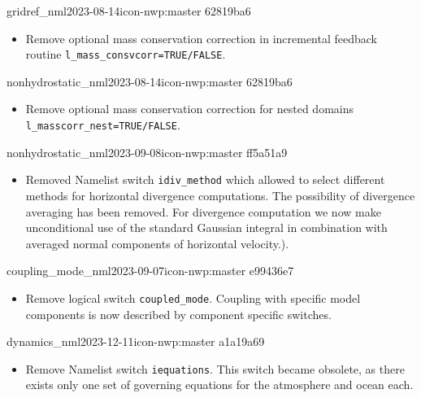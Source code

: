 \begin{changeitem}{gridref\_nml}{2023-08-14}{icon-nwp:master 62819ba6}
  \begin{itemize}
   \item Remove optional mass conservation correction in incremental feedback routine \texttt{l\_mass\_consvcorr=TRUE/FALSE}.
  \end{itemize}
\end{changeitem}

\begin{changeitem}{nonhydrostatic\_nml}{2023-08-14}{icon-nwp:master 62819ba6}
  \begin{itemize}
   \item Remove optional mass conservation correction for nested domains \texttt{l\_masscorr\_nest=TRUE/FALSE}.
  \end{itemize}
\end{changeitem}

\begin{changeitem}{nonhydrostatic\_nml}{2023-09-08}{icon-nwp:master ff5a51a9}
  \begin{itemize}
   \item Removed Namelist switch \texttt{idiv\_method} which allowed to select different methods for horizontal divergence computations. The possibility of divergence averaging has been removed. For divergence computation we now make unconditional use of the standard Gaussian integral in combination with averaged normal components of horizontal velocity.).
  \end{itemize}
\end{changeitem}

\begin{changeitem}{coupling\_mode\_nml}{2023-09-07}{icon-nwp:master e99436e7}
  \begin{itemize}
   \item Remove logical switch \texttt{coupled\_mode}. Coupling with specific
     model components is now described by component specific switches.
  \end{itemize}
\end{changeitem}

\begin{changeitem}{dynamics\_nml}{2023-12-11}{icon-nwp:master a1a19a69}
  \begin{itemize}
   \item Remove Namelist switch \texttt{iequations}. This switch became obsolete, as there exists only one set of governing equations for the atmosphere and ocean each.
  \end{itemize}
\end{changeitem}

